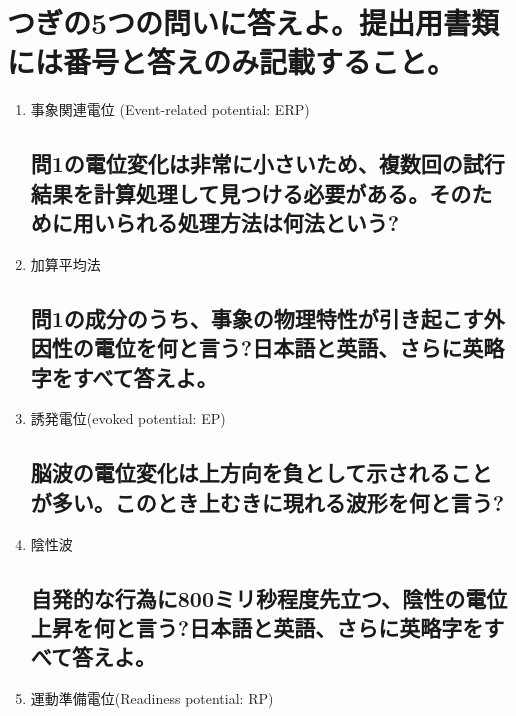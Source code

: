 \documentclass[titlepage,a4paper]{jsarticle}
\begin{document}
\section{つぎの5つの問いに答えよ。提出用書類には番号と答えのみ記載すること。}%
\begin{enumerate}
      \subsection{特定の事象に時間的に関連して出現する脳の微小電位変化を何と言う?日本語と英語、さらに英略字をすべて答えよ。}
      \item 事象関連電位 (Event-related potential: ERP)
            \subsection{問1の電位変化は非常に小さいため、複数回の試行結果を計算処理して見つける必要がある。そのために用いられる処理方法は何法という?}
      \item 加算平均法
            \subsection{問1の成分のうち、事象の物理特性が引き起こす外因性の電位を何と言う?日本語と英語、さらに英略字をすべて答えよ。}
      \item 誘発電位(evoked potential: EP)
            \subsection{脳波の電位変化は上方向を負として示されることが多い。このとき上むきに現れる波形を何と言う?}
      \item 陰性波
            \subsection{自発的な行為に800ミリ秒程度先立つ、陰性の電位上昇を何と言う?日本語と英語、さらに英略字をすべて答えよ。}
      \item 運動準備電位(Readiness potential: RP)
\end{enumerate}
\end{document}
